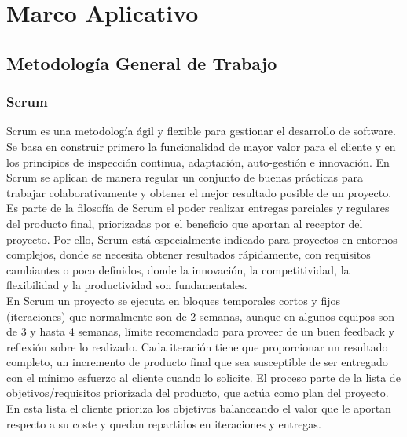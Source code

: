 
\part{Marco Aplicativo}
\chapter{Metodología General de Trabajo}

\section{Scrum}
Scrum es una metodología ágil y flexible para gestionar el desarrollo de software. Se basa en construir primero la funcionalidad de mayor valor para el cliente y en los principios de inspección continua, adaptación, auto-gestión e innovación\cite{scrumsofteng}. En Scrum se aplican de manera regular un conjunto de buenas prácticas para trabajar colaborativamente y obtener el mejor resultado posible de un proyecto.\\

Es parte de la filosofía de Scrum el poder realizar entregas parciales y regulares del producto final, priorizadas por el beneficio que aportan al receptor del proyecto. Por ello, Scrum está especialmente indicado para proyectos en entornos complejos, donde se necesita obtener resultados rápidamente, con requisitos cambiantes o poco definidos, donde la innovación, la competitividad, la flexibilidad y la productividad son fundamentales.\\

En Scrum un proyecto se ejecuta en bloques temporales cortos y fijos (iteraciones) que normalmente son de 2 semanas, aunque en algunos equipos son de 3 y hasta 4 semanas, límite recomendado para proveer de un buen feedback y reflexión sobre lo realizado. Cada iteración tiene que proporcionar un resultado completo, un incremento de producto final que sea susceptible de ser entregado con el mínimo esfuerzo al cliente cuando lo solicite. El proceso parte de la lista de objetivos/requisitos priorizada del producto, que actúa como plan del proyecto. En esta lista el cliente prioriza los objetivos balanceando el valor que le aportan respecto a su coste y quedan repartidos en iteraciones y entregas.\\  

